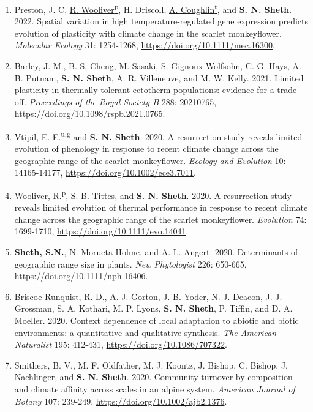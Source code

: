 \documentclass[11pt,english]{article}
\begin{document}
\begin{hangparas}{.5in}{1}
\begin{enumerate}
\item Preston, J. C, \underline{R. Wooliver\textsuperscript{p}}, H. Driscoll, \underline{A. Coughlin\textsuperscript{t}}, and \textbf{S. N. Sheth}. 2022. Spatial variation in high temperature-regulated gene expression predicts evolution of plasticity with climate change in the scarlet monkeyflower. \emph{Molecular Ecology} 31: 1254-1268, \url{https://doi.org/10.1111/mec.16300}. 

\item Barley, J. M., B. S. Cheng, M. Sasaki, S. Gignoux-Wolfsohn, C. G. Hays, A. B. Putnam, \textbf{S. N. Sheth}, A. R. Villeneuve, and M. W. Kelly. 2021. Limited plasticity in thermally tolerant ectotherm populations: evidence for a trade-off. \emph{Proceedings of the Royal Society B} 288: 20210765, \url{https://doi.org/10.1098/rspb.2021.0765}.

\item \underline{Vtipil, E. E.\textsuperscript{u,g}} and \textbf{S. N. Sheth}. 2020. A resurrection study reveals limited evolution of phenology in response to recent climate change across the geographic range of the scarlet monkeyflower. \emph{Ecology and Evolution} 10: 14165-14177, \url{https://doi.org/10.1002/ece3.7011}.

\item \underline{Wooliver, R.\textsuperscript{p}}, S. B. Tittes, and \textbf{S. N. Sheth}. 2020. A resurrection study reveals limited evolution of thermal performance in response to recent climate change across the geographic range of the scarlet monkeyflower. \emph{Evolution} 74: 1699-1710, \url{https://doi.org/10.1111/evo.14041}.

\item \textbf{Sheth, S.N.}, N. Morueta-Holme, and A. L. Angert. 2020. Determinants of geographic range size in plants. \emph{New Phytologist} 226: 650-665, \url{https://doi.org/10.1111/nph.16406}.

\item Briscoe Runquist, R. D., A. J. Gorton, J. B. Yoder, N. J. Deacon, J. J. Grossman, S. A. Kothari, M. P. Lyons, \textbf{S. N. Sheth}, P. Tiffin, and D. A. Moeller. 2020. Context dependence of local adaptation to abiotic and biotic environments: a quantitative and qualitative synthesis. \emph{The American Naturalist} 195: 412-431, \url{https://doi.org/10.1086/707322}.

\item Smithers, B. V., M. F. Oldfather, M. J. Koontz, J. Bishop, C. Bishop, J. Nachlinger, and \textbf{S. N. Sheth}. 2020. Community turnover by composition and climate affinity across scales in an alpine system. \emph{American Journal of Botany} 107: 239-249, \url{https://doi.org/10.1002/ajb2.1376}.


\end{enumerate}
\end{hangparas}
\end{document}
